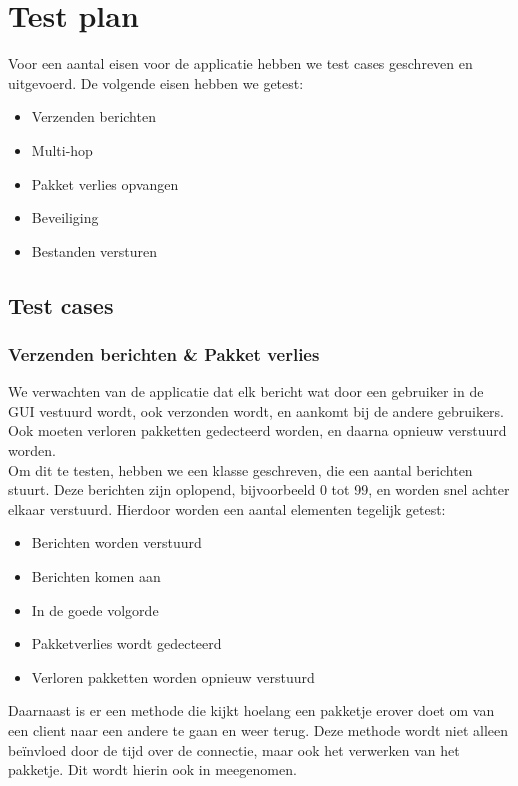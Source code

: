 \documentclass{article}
\begin{document}
\section{Test plan}
Voor een aantal eisen voor de applicatie hebben we test cases geschreven en uitgevoerd. De volgende eisen hebben we getest:
\begin{itemize}
\item Verzenden berichten
\item Multi-hop
\item Pakket verlies opvangen
\item Beveiliging
\item Bestanden versturen
\end{itemize}

\subsection{Test cases}
\subsubsection{Verzenden berichten \& Pakket verlies}
We verwachten van de applicatie dat elk bericht wat door een gebruiker in de GUI vestuurd wordt, ook verzonden wordt, en aankomt bij de andere gebruikers. Ook moeten verloren pakketten gedecteerd worden, en daarna opnieuw verstuurd worden. \\
Om dit te testen, hebben we een klasse geschreven, die een aantal berichten stuurt. Deze berichten zijn oplopend, bijvoorbeeld 0 tot 99, en worden snel achter elkaar verstuurd. Hierdoor worden een aantal elementen tegelijk getest:
\begin{itemize}
\item Berichten worden verstuurd
\item Berichten komen aan
\item In de goede volgorde
\item Pakketverlies wordt gedecteerd
\item Verloren pakketten worden opnieuw verstuurd
\end{itemize}
Daarnaast is er een methode die kijkt hoelang een pakketje erover doet om van een client naar een andere te gaan en weer terug. Deze methode wordt niet alleen be\"{i}nvloed door de tijd over de connectie, maar ook het verwerken van het pakketje. Dit wordt hierin ook in meegenomen. 
\end{document}
